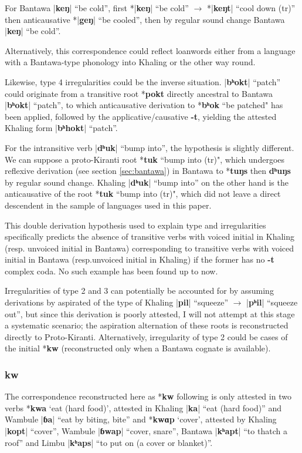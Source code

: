 \documentclass[oldfontcommands,oneside,a4paper,11pt]{article}
\newcommand{\ipa}[1]{\textbf{{\phon\mbox{#1}}}} %
\newcommand{\dhatu}[2]{|\ipa{#1}| ``#2''}
\begin{document}
 For Bantawa \dhatu{keŋ}{be cold}, first *\dhatu{keŋ}{be cold} $\rightarrow$ *\dhatu{keŋt}{cool down (tr)} then anticausative *\dhatu{geŋ}{be cooled}, then by regular sound change Bantawa \dhatu{keŋ}{be cold}.
 
 Alternatively, this correspondence could reflect loanwords either from a language with a Bantawa-type phonology into Khaling or the other way round.
 
Likewise, type 4  irregularities could be the inverse situation. \dhatu{bʰokt}{patch} could originate from a transitive root *\ipa{pokt} directly ancestral to Bantawa \dhatu{bʰokt}{patch}, to which anticausative derivation to *\ipa{bʰok} ``be patched" has been applied, followed by the applicative/causative \ipa{-t}, yielding the attested Khaling form \dhatu{bʰhokt}{patch}. 

For the intransitive verb \dhatu{dʰuk}{bump into}, the hypothesis is slightly different. We can suppose a proto-Kiranti root *\ipa{tuk} ``bump into (tr)", which undergoes reflexive derivation (see section \ref{sec:bantawa}) in Bantawa to *\ipa{tuŋs} then \ipa{dʰuŋs} by regular sound change. Khaling \dhatu{dʰuk}{bump into} on the other hand is the anticausative of the root *\ipa{tuk} ``bump into (tr)", which did not leave a direct descendent in the sample of languages used in this paper.
 
 This double derivation hypothesis used to explain type  and irregularities specifically predicts the absence of transitive verbs with voiced initial in Khaling (resp. unvoiced initial in Bantawa) corresponding to transitive verbs with voiced initial in Bantawa (resp.unvoiced initial in Khaling) if the former has no \ipa{-t} complex coda. No such example has been found up to now.
 
 Irregularities of type 2 and 3 can potentially be accounted for by assuming derivations by aspirated of the type of Khaling \dhatu{pil}{squeeze} $\rightarrow$ \dhatu{pʰil}{squeeze out}, but since this derivation is poorly attested, I will not attempt at this stage a systematic scenario; the aspiration alternation of these roots is reconstructed directly to Proto-Kiranti. Alternatively, irregularity of type  2 could be cases of the initial *\ipa{kw} (reconstructed only when a Bantawa cognate is available).

\subsubsection{\ipa{kw}}
The correspondence reconstructed here as *\ipa{kw} following \citet{opgenort04implosives} is only attested in two verbs *\ipa{kwa} `eat (hard food)', attested in Khaling \dhatu{ka}{eat (hard food)} and Wambule \dhatu{ɓa}{eat by biting, bite} and  *\ipa{kwɑp} `cover', attested by  Khaling \dhatu{kopt}{cover}, Wambule \dhatu{ɓwap}{cover, snare}, Bantawa \dhatu{kʰapt}{to thatch a roof} and Limbu  \dhatu{kʰaps}{to put on (a cover or blanket)}. 
 
\end{document}
